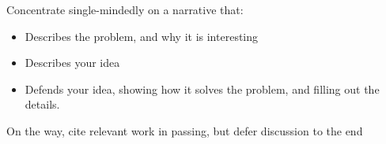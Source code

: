 Concentrate single-mindedly on a narrative that:
\begin{itemize}
\item Describes the problem, and why it is interesting
\item Describes your idea
\item Defends your idea, showing how it solves the problem, and filling out the details.
\end{itemize}
On the way, cite relevant work in passing, but defer discussion to the end

